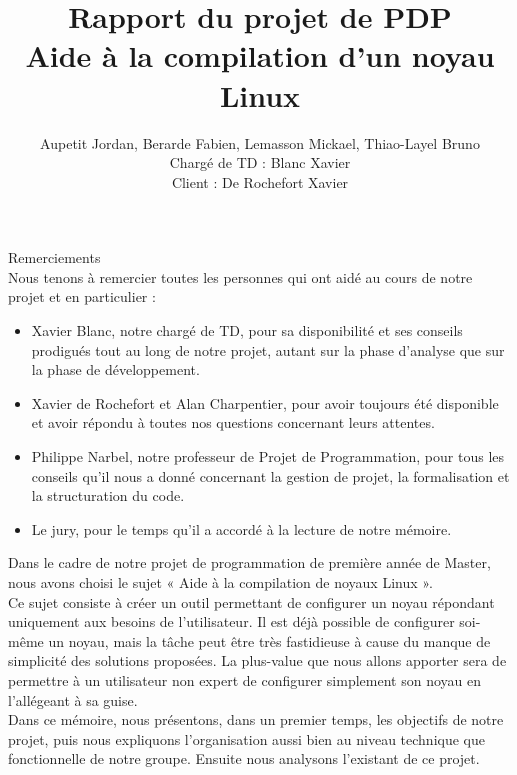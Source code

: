 \documentclass[17pts]{report}
\title{Rapport du projet de PDP \\ Aide à la compilation d'un noyau Linux}
\author{Aupetit Jordan, Berarde Fabien, Lemasson Mickael, Thiao-Layel Bruno \\
        Chargé de TD : Blanc Xavier\\
        Client : De Rochefort Xavier}
\begin{document}
\maketitle
\clearpage
\pagestyle{empty}
Remerciements\\

Nous tenons à remercier toutes les personnes qui ont aidé au cours de notre
projet et en particulier :\\

\begin{itemize}
  \item Xavier Blanc, notre chargé de TD, pour sa disponibilité et ses conseils
      prodigués tout au long de notre projet, autant sur la phase d'analyse que
      sur la phase de développement.
  \item Xavier de Rochefort et Alan Charpentier, pour avoir toujours été
      disponible et avoir répondu à toutes nos questions concernant leurs
      attentes.
  \item Philippe Narbel, notre professeur de Projet de Programmation, pour tous
      les conseils qu'il nous a donné concernant la gestion de projet, la
      formalisation et la structuration du code.
  \item Le jury, pour le temps qu'il a accordé à la lecture de notre mémoire.
\end{itemize}

\tableofcontents
\clearpage

\nocite{*}
\listoffigures
\clearpage

\pagestyle{IHA-fancy-style}

Dans le cadre de notre projet de programmation de première année de Master,
nous avons choisi le sujet « Aide à la compilation de noyaux Linux ».  \\

Ce sujet consiste à créer un outil permettant de configurer un noyau répondant
uniquement aux besoins de l'utilisateur. Il est déjà possible de configurer
soi-même un noyau, mais la tâche peut être très fastidieuse à cause du manque
de simplicité des solutions proposées. La plus-value que nous allons apporter
sera de permettre à un utilisateur non expert de configurer simplement son
noyau en l'allégeant à sa guise.  \\

Dans ce mémoire, nous présentons, dans un premier temps, les objectifs de notre
projet, puis nous expliquons l’organisation aussi bien au niveau technique que
fonctionnelle de notre groupe. Ensuite nous analysons l'existant de ce projet.
\\
\end{document}
